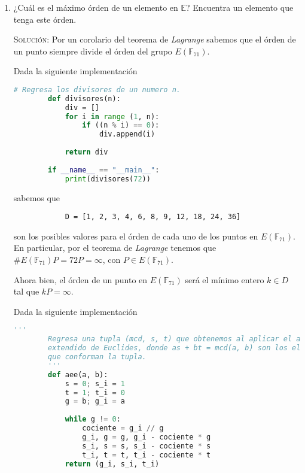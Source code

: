 \documentclass[letterpaper,11pt]{article}
\begin{document}
\begin{enumerate}
\begin{enumerate}
\begin{proof}
        \end{proof}

        \item ¿Cuál es el máximo órden de un elemento en $\mathbb{E}$? Encuentra 
        un elemento que tenga este órden. 

        \textsc{Solución:} Por un corolario del teorema de \textit{Lagrange}
        sabemos que el órden de un punto siempre divide el órden del grupo
        $E(\mathbb{F}_{71})$. 
        
        Dada la siguiente implementación
        \begin{lstlisting}[language=Python]
        # Regresa los divisores de un numero n.
        def divisores(n):
            div = []
            for i in range (1, n):
                if ((n % i) == 0):
                    div.append(i)
            
            return div
        
        if __name__ == "__main__":
            print(divisores(72))
        \end{lstlisting}
        
        sabemos que 
        \begin{verbatim}
            D = [1, 2, 3, 4, 6, 8, 9, 12, 18, 24, 36]
        \end{verbatim}
        
        son los posibles valores para el órden de cada uno de los puntos 
        en $E (\mathbb{F}_{71})$. En particular, por el teorema de 
        \textit{Lagrange} tenemos que $\#E (\mathbb{F}_{71})P = 72P = \infty$,
        con $P \in E (\mathbb{F}_{71})$. 
        
        Ahora bien, el órden de un punto en $E (\mathbb{F}_{71})$ será el 
        mínimo entero $k \in D$ tal que $kP = \infty$.  
        
        Dada la siguiente implementación
        \begin{lstlisting}[language=Python]
        '''
        Regresa una tupla (mcd, s, t) que obtenemos al aplicar el algoritmo 
        extendido de Euclides, donde as + bt = mcd(a, b) son los elementos 
        que conforman la tupla.
        '''
        def aee(a, b):
            s = 0; s_i = 1
            t = 1; t_i = 0
            g = b; g_i = a
        
            while g != 0:
                cociente = g_i // g
                g_i, g = g, g_i - cociente * g
                s_i, s = s, s_i - cociente * s
                t_i, t = t, t_i - cociente * t
            return (g_i, s_i, t_i)
            

\end{lstlisting}
\end{enumerate}
\end{enumerate}
\end{document}
